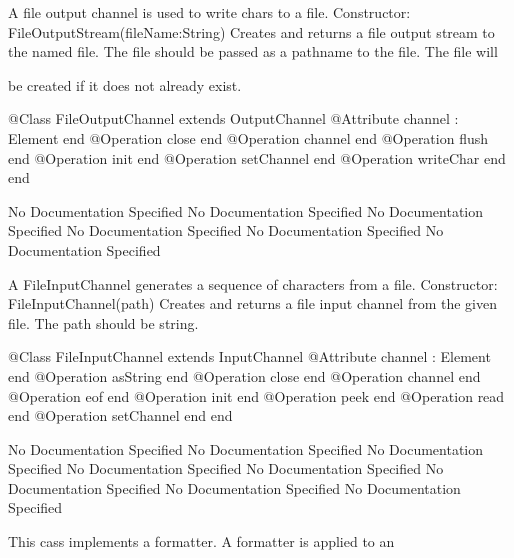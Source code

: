       A file output channel is used to write chars to a file.
      Constructor: FileOutputStream(fileName:String)
        Creates and returns a file output stream to the named file.
        The file should be passed as a pathname to the file. The file will

        be created if it does not already exist.
\begin{Interface}
@Class FileOutputChannel extends OutputChannel
  @Attribute channel : Element end
  @Operation close end
  @Operation channel end
  @Operation flush end
  @Operation init end
  @Operation setChannel end
  @Operation writeChar end
end
\end{Interface}
No Documentation Specified
No Documentation Specified
No Documentation Specified
No Documentation Specified
No Documentation Specified
No Documentation Specified

       A FileInputChannel generates a sequence of characters from a file.
       Constructor: FileInputChannel(path)
         Creates and returns a file input channel from the given file.
         The path should be string.
\begin{Interface}
@Class FileInputChannel extends InputChannel
  @Attribute channel : Element end
  @Operation asString end
  @Operation close end
  @Operation channel end
  @Operation eof end
  @Operation init end
  @Operation peek end
  @Operation read end
  @Operation setChannel end
end
\end{Interface}
No Documentation Specified
No Documentation Specified
No Documentation Specified
No Documentation Specified
No Documentation Specified
No Documentation Specified
No Documentation Specified
No Documentation Specified

      This cass implements a formatter. A formatter is applied to an

